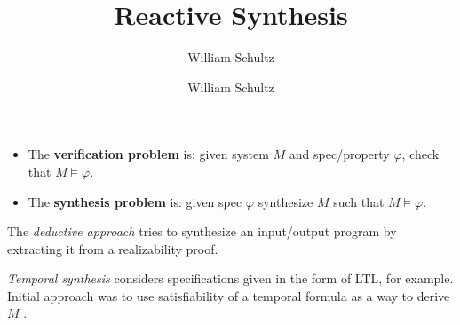 \documentclass[10pt,a4paper]{article}
\author{William Schultz}
\begin{document}
\title{Reactive Synthesis}
\author{William Schultz}
\maketitle


\begin{itemize}
    \item The \textbf{verification problem} is: given system $M$ and spec/property $\varphi$, check that $M \vDash \varphi$.
    \item The \textbf{synthesis problem} is: given spec $\varphi$ synthesize $M$ such that $M \vDash \varphi$.
\end{itemize}
The \textit{deductive approach} \cite{manna1980deductive} tries to synthesize an input/output program by extracting it from a realizability proof.

\textit{Temporal synthesis} considers specifications given in the form of LTL, for example. Initial approach was to use satisfiability of a temporal formula as a way to derive $M$ \cite{1981clarkemerson}.




\end{document}

